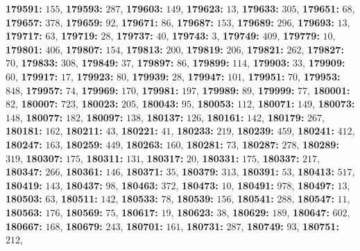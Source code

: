 \textsf{\bfseries 179591:} $155$, \textsf{\bfseries 179593:} $287$, \textsf{\bfseries 179603:} $149$, \textsf{\bfseries 179623:} $13$, \textsf{\bfseries 179633:} $305$, \textsf{\bfseries 179651:} $68$, \textsf{\bfseries 179657:} $378$, \textsf{\bfseries 179659:} $92$, \textsf{\bfseries 179671:} $86$, \textsf{\bfseries 179687:} $153$, \textsf{\bfseries 179689:} $296$, \textsf{\bfseries 179693:} $13$, \textsf{\bfseries 179717:} $63$, \textsf{\bfseries 179719:} $28$, \textsf{\bfseries 179737:} $40$, \textsf{\bfseries 179743:} $3$, \textsf{\bfseries 179749:} $409$, \textsf{\bfseries 179779:} $10$, \textsf{\bfseries 179801:} $406$, \textsf{\bfseries 179807:} $154$, \textsf{\bfseries 179813:} $200$, \textsf{\bfseries 179819:} $206$, \textsf{\bfseries 179821:} $262$, \textsf{\bfseries 179827:} $70$, \textsf{\bfseries 179833:} $308$, \textsf{\bfseries 179849:} $37$, \textsf{\bfseries 179897:} $86$, \textsf{\bfseries 179899:} $114$, \textsf{\bfseries 179903:} $33$, \textsf{\bfseries 179909:} $60$, \textsf{\bfseries 179917:} $17$, \textsf{\bfseries 179923:} $80$, \textsf{\bfseries 179939:} $28$, \textsf{\bfseries 179947:} $101$, \textsf{\bfseries 179951:} $70$, \textsf{\bfseries 179953:} $848$, \textsf{\bfseries 179957:} $74$, \textsf{\bfseries 179969:} $170$, \textsf{\bfseries 179981:} $197$, \textsf{\bfseries 179989:} $89$, \textsf{\bfseries 179999:} $77$, \textsf{\bfseries 180001:} $82$, \textsf{\bfseries 180007:} $723$, \textsf{\bfseries 180023:} $205$, \textsf{\bfseries 180043:} $95$, \textsf{\bfseries 180053:} $112$, \textsf{\bfseries 180071:} $149$, \textsf{\bfseries 180073:} $148$, \textsf{\bfseries 180077:} $182$, \textsf{\bfseries 180097:} $138$, \textsf{\bfseries 180137:} $126$, \textsf{\bfseries 180161:} $142$, \textsf{\bfseries 180179:} $267$, \textsf{\bfseries 180181:} $162$, \textsf{\bfseries 180211:} $43$, \textsf{\bfseries 180221:} $41$, \textsf{\bfseries 180233:} $219$, \textsf{\bfseries 180239:} $459$, \textsf{\bfseries 180241:} $412$, \textsf{\bfseries 180247:} $163$, \textsf{\bfseries 180259:} $449$, \textsf{\bfseries 180263:} $160$, \textsf{\bfseries 180281:} $73$, \textsf{\bfseries 180287:} $278$, \textsf{\bfseries 180289:} $319$, \textsf{\bfseries 180307:} $175$, \textsf{\bfseries 180311:} $131$, \textsf{\bfseries 180317:} $20$, \textsf{\bfseries 180331:} $175$, \textsf{\bfseries 180337:} $217$, \textsf{\bfseries 180347:} $266$, \textsf{\bfseries 180361:} $146$, \textsf{\bfseries 180371:} $35$, \textsf{\bfseries 180379:} $313$, \textsf{\bfseries 180391:} $53$, \textsf{\bfseries 180413:} $517$, \textsf{\bfseries 180419:} $143$, \textsf{\bfseries 180437:} $98$, \textsf{\bfseries 180463:} $372$, \textsf{\bfseries 180473:} $10$, \textsf{\bfseries 180491:} $978$, \textsf{\bfseries 180497:} $13$, \textsf{\bfseries 180503:} $63$, \textsf{\bfseries 180511:} $142$, \textsf{\bfseries 180533:} $78$, \textsf{\bfseries 180539:} $156$, \textsf{\bfseries 180541:} $288$, \textsf{\bfseries 180547:} $11$, \textsf{\bfseries 180563:} $176$, \textsf{\bfseries 180569:} $75$, \textsf{\bfseries 180617:} $19$, \textsf{\bfseries 180623:} $38$, \textsf{\bfseries 180629:} $189$, \textsf{\bfseries 180647:} $602$, \textsf{\bfseries 180667:} $168$, \textsf{\bfseries 180679:} $243$, \textsf{\bfseries 180701:} $161$, \textsf{\bfseries 180731:} $287$, \textsf{\bfseries 180749:} $93$, \textsf{\bfseries 180751:} $212$, 
